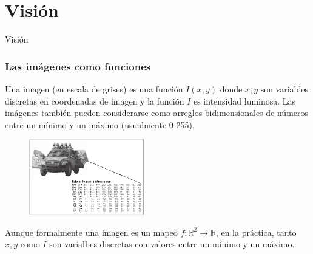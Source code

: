 \section{Visión}

\begin{frame}
  \Huge
  Visión
\end{frame}

\begin{frame}\frametitle{Las imágenes como funciones}
Una imagen (en escala de grises) es una función $I(x,y)$ donde $x,y$ son variables discretas en coordenadas de imagen y la función $I$ es intensidad luminosa. Las imágenes también pueden considerarse como arreglos bidimensionales de números entre un mínimo y un máximo (usualmente 0-255).
\begin{figure}
  \centering
  \includegraphics[width=0.45\textwidth]{Figures/representation_image.png}
\end{figure}
  Aunque formalmente una imagen es un mapeo $f:\mathbb{R}^2\rightarrow \mathbb{R}$, en la práctica, tanto $x,y$ como $I$ son varialbes discretas con valores entre un mínimo y un máximo.
\end{frame}

